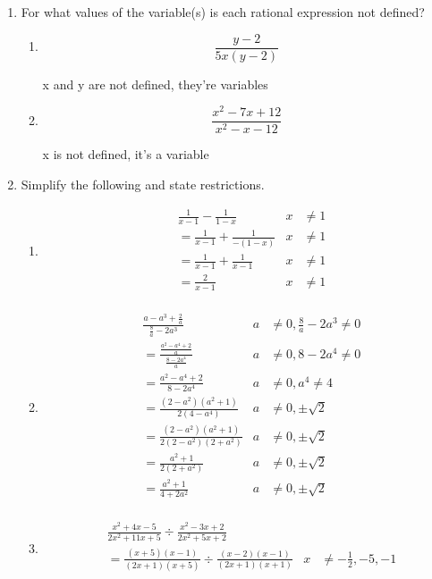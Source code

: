 \documentclass[paper=a4, fontsize=11pt]{scrartcl}
\begin{document}
\begin{enumerate}
    \item For what values of the variable(s) is each rational expression not defined?
    \begin{enumerate}
        \item $$\frac{y-2}{5x(y-2)}$$
        
        x and y are not defined, they're variables

        \item $$\frac{x^2-7x+12}{x^2-x-12}$$
        
        x is not defined, it's a variable
    \end{enumerate}
    \item Simplify the following and state restrictions.
    \begin{enumerate}
        \item \begin{align*}
            &\frac{1}{x-1}-\frac{1}{1-x}&x&\neq 1\\
            &=\frac{1}{x-1}+\frac{1}{-(1-x)}&x&\neq 1\\
            &=\frac{1}{x-1}+\frac{1}{x-1}&x&\neq 1\\
            &=\frac{2}{x-1}&x&\neq 1 \\
        \end{align*}
        \item \begin{align*}
            &\frac{a-a^3+\frac{2}{a}}{\frac{8}{a}-2a^3}&a&\neq 0,\frac{8}{a}-2a^3\neq 0\\
            &=\frac{\frac{a^2-a^4+2}{a}}{\frac{8-2a^4}{a}}&a&\neq 0,8-2a^4 \neq 0\\
            &=\frac{a^2-a^4+2}{8-2a^4}&a&\neq 0,a^4\neq 4\\
            &=\frac{(2-a^2)(a^2+1)}{2(4-a^4)}&a&\neq 0,\pm \sqrt{2}\\
            &=\frac{(2-a^2)(a^2+1)}{2(2-a^2)(2+a^2)}&a&\neq 0,\pm \sqrt{2}\\
            &=\frac{a^2+1}{2(2+a^2)}&a&\neq 0,\pm \sqrt{2}\\
            &=\frac{a^2+1}{4+2a^2}&a&\neq 0,\pm \sqrt{2}\\
        \end{align*}
        \item \begin{align*}
            &\frac{x^2+4x-5}{2x^2+11x+5}\div\frac{x^2-3x+2}{2x^2+5x+2}\\
            &=\frac{(x+5)(x-1)}{(2x+1)(x+5)}\div\frac{(x-2)(x-1)}{(2x+1)(x+1)}&x&\neq-\frac{1}{2},-5,-1\\

\end{align*}
\end{enumerate}
\end{enumerate}
\end{document}
